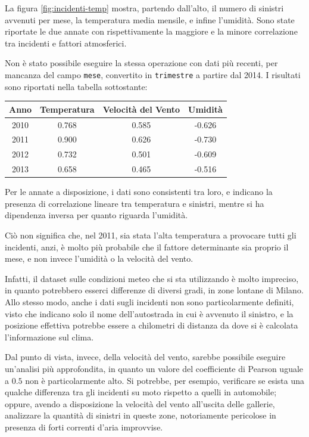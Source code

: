 \documentclass[a4paper]{report}
\newcommand{\columnstyle}[1]{\texttt{#1}}
\begin{document}
La figura \ref{fig:incidenti-temp} mostra, partendo dall'alto, il numero di sinistri 
avvenuti per mese, la temperatura media mensile, e infine l'umidità. 
Sono state riportate le due annate con rispettivamente la maggiore e la minore correlazione tra 
incidenti e fattori atmosferici. 

Non è stato possibile eseguire la stessa operazione con dati più recenti, per mancanza del 
campo \columnstyle{mese}, convertito in \columnstyle{trimestre} a partire dal 2014. 
I risultati sono riportati nella tabella sottostante: 

\begin{center}
    \def\arraystretch{1.5}%
    \begin{tabular}{ |c|c|c|c| } 
    \hline
    Anno & Temperatura & Velocità del Vento & Umidità \\ 
    \hline
    \rowcolor{TableGray}
    2010 & 0.768 & 0.585 & -0.626 \\
    2011 & 0.900 & 0.626 & -0.730 \\
    \rowcolor{TableGray}
    2012 & 0.732 & 0.501 & -0.609 \\
    2013 & 0.658 & 0.465 & -0.516 \\
    \hline
    \end{tabular}
\end{center}

Per le annate a disposizione, i dati sono consistenti tra loro, e indicano la presenza di 
correlazione lineare tra temperatura e sinistri, mentre si ha dipendenza inversa per quanto 
riguarda l'umidità. 

Ciò non significa che, nel 2011, sia stata l'alta temperatura a provocare 
tutti gli incidenti, anzi, è molto più probabile che il fattore determinante 
sia proprio il mese, e non invece l'umidità o la velocità del vento. 

Infatti, il dataset sulle condizioni meteo che si sta utilizzando è molto impreciso, 
in quanto potrebbero esserci differenze di diversi gradi, in zone lontane di Milano. 
Allo stesso modo, anche i dati sugli incidenti non sono particolarmente definiti, 
visto che indicano solo il nome dell'autostrada in cui è avvenuto 
il sinistro, e la posizione effettiva potrebbe essere a chilometri di distanza da dove 
si è calcolata l'informazione sul clima. 

Dal punto di vista, invece, della velocità del vento, sarebbe possibile eseguire 
un'analisi più approfondita, in quanto un valore del coefficiente di Pearson uguale 
a $0.5$ non è particolarmente alto. 
Si potrebbe, per esempio, verificare se esista una qualche differenza tra gli 
incidenti su moto rispetto a quelli in automobile; 
oppure, avendo a disposizione la velocità del vento all'uscita delle gallerie, 
analizzare la quantità di sinistri in queste zone, notoriamente pericolose 
in presenza di forti correnti d'aria improvvise. 
\end{document}
